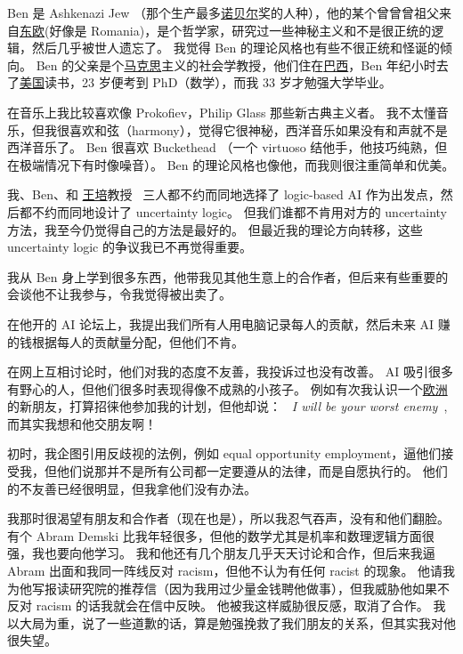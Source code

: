 \documentclass[12pt]{report}
\newcommand{\speechEn}[1]{\textrm{\textit{\ #1\ }}}
\begin{document}
{Ben 是 Ashkenazi Jew （那个生产最多\uline{诺贝尔}奖的人种），他的某个曾曾曾祖父来自\uline{东欧}(好像是 Romania)，是个哲学家，研究过一些神秘主义和不是很正统的逻辑，然后几乎被世人遗忘了。 我觉得 Ben 的理论风格也有些不很正统和怪诞的倾向。  Ben 的父亲是个\uline{马克思}主义的社会学教授，他们住在\uline{巴西}，Ben 年纪小时去了\uline{美国}读书，23 岁便考到 PhD（数学），而我 33 岁才勉强大学毕业。

在音乐上我比较喜欢像 Prokofiev，Philip Glass 那些新古典主义者。 我不太懂音乐，但我很喜欢和弦（harmony），觉得它很神秘，西洋音乐如果没有和声就不是西洋音乐了。 Ben 很喜欢 Buckethead （一个 virtuoso 结他手，他技巧纯熟，但在极端情况下有时像噪音）。 Ben 的理论风格也像他，而我则很注重简单和优美。

我、Ben、和 \uline{王培}教授 ~三人都不约而同地选择了 logic-based AI 作为出发点，然后都不约而同地设计了 uncertainty logic。  但我们谁都不肯用对方的 uncertainty 方法，我至今仍觉得自己的方法是最好的。 但最近我的理论方向转移，这些 uncertainty logic 的争议我已不再觉得重要。

我从 Ben 身上学到很多东西，他带我见其他生意上的合作者，但后来有些重要的会谈他不让我参与，令我觉得被出卖了。

在他开的 AI 论坛上，我提出我们所有人用电脑记录每人的贡献，然后未来 AI 赚的钱根据每人的贡献量分配，但他们不肯。

在网上互相讨论时，他们对我的态度不友善，我投诉过也没有改善。  AI 吸引很多有野心的人，但他们很多时表现得像不成熟的小孩子。  例如有次我认识一个\uline{欧洲}的新朋友，打算招徕他参加我的计划，但他却说： \speechEn{I will be your worst enemy}, 而其实我想和他交朋友啊！

初时，我企图引用反歧视的法例，例如 equal opportunity employment，逼他们接受我，但他们说那并不是所有公司都一定要遵从的法律，而是自愿执行的。 他们的不友善已经很明显，但我拿他们没有办法。

我那时很渴望有朋友和合作者（现在也是），所以我忍气吞声，没有和他们翻脸。 有个 Abram Demski 比我年轻很多，但他的数学尤其是机率和数理逻辑方面很强，我也要向他学习。 我和他还有几个朋友几乎天天讨论和合作，但后来我逼 Abram 出面和我同一阵线反对 racism，但他不认为有任何 racist 的现象。 他请我为他写报读研究院的推荐信（因为我用过少量金钱聘他做事），但我威胁他如果不反对 racism 的话我就会在信中反映。 他被我这样威胁很反感，取消了合作。 我以大局为重，说了一些道歉的话，算是勉强挽救了我们朋友的关系，但其实我对他很失望。

}
\end{document}
